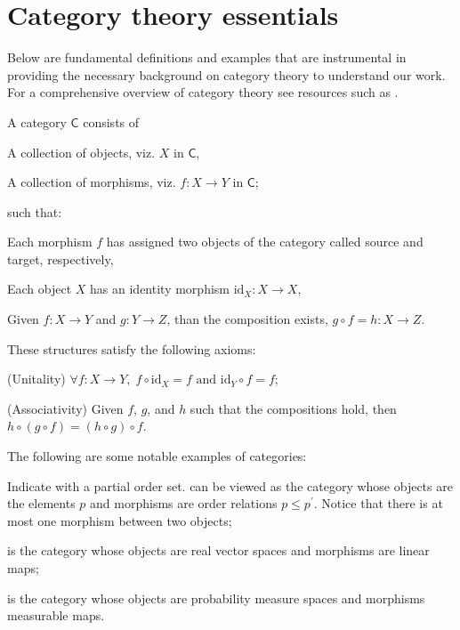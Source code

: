 
\section{Category theory essentials}\label{app:CT_background}

Below are fundamental definitions and examples that are instrumental in providing the necessary background on category theory to understand our work.
For a comprehensive overview of category theory see resources such as .

\begin{definition}[Category]\label{def:category}
    A category $\mathsf{C}$ consists of
    \begin{squishlist}
        \item A collection of objects, viz. $X$ in $\mathsf{C}$,
        \item A collection of morphisms, viz. $f: X \rightarrow Y$ in $\mathsf{C}$;
    \end{squishlist}
    such that:
    \begin{squishlist}
        \item Each morphism $f$ has assigned two objects of the category called source and target, respectively,
        \item Each object $X$ has an identity morphism $\mathrm{id}_X: X \rightarrow X$,
        \item Given $f: X\rightarrow Y $ and $g:Y\rightarrow Z$, than the composition exists, $g \circ f = h: X \rightarrow Z$.
    \end{squishlist}
    These structures satisfy the following axioms:
    \begin{squishlist}
        \item (Unitality) $\forall f: X \rightarrow Y, \; f \circ \mathrm{id}_X=f \text{ and } \mathrm{id}_Y \circ f = f$;
        \item (Associativity) Given $f$, $g$, and $h$ such that the compositions hold, then $h \circ (g \circ f) = (h \circ g) \circ f$.
    \end{squishlist}
\end{definition}

\begin{example}
    The following are some notable examples of categories:
    \begin{squishlist}
        \item Indicate with \Poset a partial order set. \Poset can be viewed as the category whose objects are the elements $p$ and morphisms are order relations $p \leq p^\prime$. Notice that there is at most one morphism between two objects;
        \item \Vect is the category whose objects are real vector spaces and morphisms are linear maps;
        \item \Prob is the category whose objects are probability measure spaces and morphisms measurable maps.
    \end{squishlist}
\end{example}

